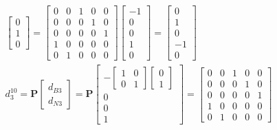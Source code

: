 \documentclass[11pt]{article}
\begin{document}
\begin{enumerate}
\begin{align*}
\begin{bmatrix}
        0 \\ 1 \\ 0
      \end{bmatrix}
      = 
      \begin{bmatrix}
        0 & 0 & 1 & 0 & 0 \\
        0 & 0 & 0 & 1 & 0 \\
        0 & 0 & 0 & 0 & 1 \\
        1 & 0 & 0 & 0 & 0 \\
        0 & 1 & 0 & 0 & 0
      \end{bmatrix}
      \begin{bmatrix}
        -1 \\ 0 \\ 0 \\ 1 \\ 0
      \end{bmatrix}
      =
      \begin{bmatrix}
        0 \\ 1 \\ 0 \\ -1 \\ 0
      \end{bmatrix}
      \\
      d_3^{10} = \textbf{P}
      \begin{bmatrix}
         d_{B3} \\ d_{N3}
      \end{bmatrix}
      =
      \textbf{P}
      \begin{bmatrix}
        -
        \begin{bmatrix}
         1 & 0 \\ 0 & 1   
        \end{bmatrix}
        \begin{bmatrix}
            0 \\ 1
        \end{bmatrix} \\
        0 \\ 0 \\ 1
      \end{bmatrix}
      = 
      \begin{bmatrix}
        0 & 0 & 1 & 0 & 0 \\
        0 & 0 & 0 & 1 & 0 \\
        0 & 0 & 0 & 0 & 1 \\
        1 & 0 & 0 & 0 & 0 \\
        0 & 1 & 0 & 0 & 0
      \end{bmatrix}

\end{align*}
\end{enumerate}
\end{document}
